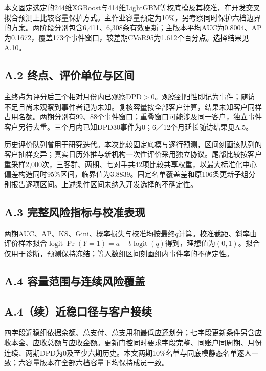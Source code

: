 本文固定选定的244维XGBoost与414维LightGBM等权底模及其校准，在开发交叉拟合预测上比较容量保护方式。主作业容量预定为10\%，另考察同时保护六档边界的方案。两阶段分别包含6,411、6,308条有效更新；主版本平均AUC为0.8004、AP为0.1672，覆盖173个事件窗口，较差期CVaR95为1.612个百分点。选择结果见A.10。

\subsection*{A.2 终点、评价单位与区间}
主终点为评分后三个相对月份内已观察DPD$>0$。观察到阳性即记为事件；随访不足且尚未观察到事件者记为未知。复核容量按全部客户计算，结果未知客户同样占用名额。两期分别有99、88个事件窗口；重叠窗口可能涉及同一客户，独立事件客户另行去重。三个月内已知DPD30事件为0；6／12个月延长随访结果见A.5。

历史评价队列曾用于研究迭代。本次比较固定底模与逐行预测，区间刻画该队列的客户抽样变异；真实日历外推与新机构一次性评价采用独立协议。尾部比较按客户重采样2,000次，三客群、两期、七对手共42项比较共享权重，以最大标准化中心偏差构造同时95\%区间，临界值为3.8839。固定名单覆盖差和原106条更新子组分别报告逐项区间。上述条件区间未纳入开发选择的不确定性。

\clearpage\subsection*{A.3 完整风险指标与校准表现}

两期AUC、AP、KS、Gini、概率损失与校准均按最终$q$计算。校准截距、斜率由评价样本拟合$\operatorname{logit}\Pr(Y=1)=a+b\operatorname{logit}(q)$得到，理想值为$(0,1)$。拟合仅用于诊断，预测保持冻结；等人数组区间刻画组内事件率的不确定性。

\clearpage\subsection*{A.4 容量范围与连续风险覆盖}


\clearpage\subsection*{A.4（续）近稳口径与客户接续}


四字段近稳组依据余额、总支付、总支用和最低应还划分；七字段更新条件另含应收本金、应收总额与应收金额。更新门控同时要求字段完整、同账户同周期、月份连续、两期DPD为0及至少六期历史。本文两期10\%名单与同底模静态名单逐人一致；六容量版本在全部六档容量下均保持成员一致。

